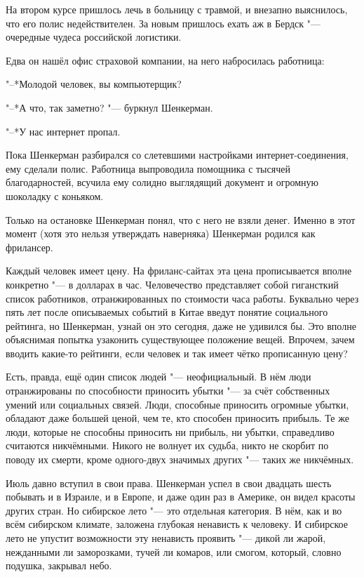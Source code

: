 \textspace

На втором курсе пришлось лечь в больницу с травмой, и внезапно выяснилось, что его полис недействителен.
За новым пришлось ехать аж в Бердск "--- очередные чудеса российской логистики.

Едва он нашёл офис страховой компании, на него набросилась работница:

"--*Молодой человек, вы компьютерщик?

"--*А что, так заметно? "--- буркнул Шенкерман.

"--*У нас интернет пропал.

Пока Шенкерман разбирался со слетевшими настройками интернет-соединения, ему сделали полис.
Работница выпроводила помощника с тысячей благодарностей, всучила ему солидно выглядящий документ и огромную шоколадку с коньяком.

Только на остановке Шенкерман понял, что с него не взяли денег.
Именно в этот момент (хотя это нельзя утверждать наверняка) Шенкерман родился как фрилансер.

Каждый человек имеет цену.
На фриланс-сайтах эта цена прописывается вполне конкретно "--- в долларах в час.
Человечество представляет собой гигансткий список работников, отранжированных по стоимости часа работы.
Буквально через пять лет после описываемых событий в Китае введут понятие социального рейтинга, но Шенкерман, узнай он это сегодня, даже не удивился бы.
Это вполне объяснимая попытка узаконить существующее положение вещей.
Впрочем, зачем вводить какие-то рейтинги, если человек и так имеет чётко прописанную цену?

Есть, правда, ещё один список людей "--- неофициальный.
В нём люди отранжированы по способности приносить убытки "--- за счёт собственных умений или социальных связей.
Люди, способные приносить огромные убытки, обладают даже большей ценой, чем те, кто способен приносить прибыль.
Те же люди, которые не способны приносить ни прибыль, ни убытки, справедливо считаются никчёмными.
Никого не волнует их судьба, никто не скорбит по поводу их смерти, кроме одного-двух значимых других "--- таких же никчёмных.

\asterism

Июль давно вступил в свои права.
Шенкерман успел в свои двадцать шесть побывать и в Израиле, и в Европе, и даже один раз в Америке, он видел красоты других стран.
Но сибирское лето "--- это отдельная категория.
В нём, как и во всём сибирском климате, заложена глубокая ненависть к человеку.
И сибирское лето не упустит возможности эту ненависть проявить "--- дикой ли жарой, нежданными ли заморозками, тучей ли комаров, или смогом, который, словно подушка, закрывал небо.

